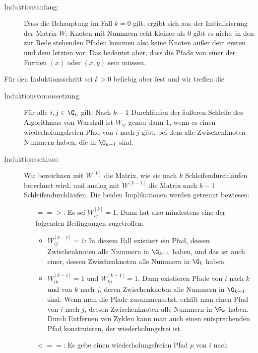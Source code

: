 \begin{beweis}
  \leavevmode~\\[-\baselineskip]
  \begin{description}
  \item[Induktionsanfang:] Dass die Behauptung im Fall $k=0$ gilt,
    ergibt sich aus der Initialisierung der Matrix $W$: Knoten mit
    Nummern echt kleiner als $0$ gibt es nicht; in den zur Rede
    stehenden Pfaden kommen also keine Knoten außer dem ersten und dem
    letzten vor. Das bedeutet aber, dass die Pfade von einer der
    Formen $(x)$ oder $(x,y)$ sein müssen.
  \end{description}
  Für den Induktionsschritt sei $k>0$ beliebig aber fest und wir
  treffen die
  \begin{description}
  \item[Induktionsvoraussetzung:] Für alle $i,j\in \G_n$ gilt: Nach
    $k-1$ Durchläufen der äußeren Schleife des Algorithmus von
    Warshall ist $W_{ij}$ genau dann $1$, wenn es einen
    wiederholungsfreien Pfad von $i$ nach $j$ gibt, bei dem alle
    Zwischenknoten Nummern haben, die in $\G_{k-1}$ sind.
  \item[Induktionsschluss:] Wir bezeichnen mit $W^{[k]}$ die Matrix, wie
    sie nach $k$ Schleifendurchläufen berechnet wird, und analog mit
    $W^{[k-1]}$ die Matrix nach $k-1$ Schleifendurchläufen. Die beiden
    Implikationen werden getrennt bewiesen:
    \begin{itemize}
    \item[$==>$:] Es sei $W^{[k]}_{ij}=1$. Dann hat also mindestens eine
      der folgenden Bedingungen zugetroffen:
      \begin{itemize}
      \item $W^{[k-1]}_{ij}=1$: In diesem Fall existiert ein Pfad,
        dessen Zwischenknoten alle Nummern in $\G_{k-1}$ haben, und
        das ist auch einer, dessen Zwischenknoten alle Nummern in
        $\G_k$ haben.
      \item $W^{[k-1]}_{ik}=1$ und $W^{[k-1]}_{kj}=1$. Dann existieren
        Pfade von $i$ nach $k$ und von $k$ nach $j$, deren
        Zwischenknoten alle Nummern in $\G_{k-1}$ sind. Wenn man die
        Pfade zusammensetzt, erhält man einen Pfad von $i$ nach $j$,
        dessen Zwischenknoten alle Nummern in $\G_k$ haben. Durch
        Entfernen von Zyklen kann man auch einen entsprechenden Pfad
        konstruieren, der wiederholungsfrei ist.
      \end{itemize}
    \item[$<==$:] Es gebe einen wiederholungsfreien Pfad $p$ von $i$ nach

\end{itemize}
\end{description}
\end{beweis}
